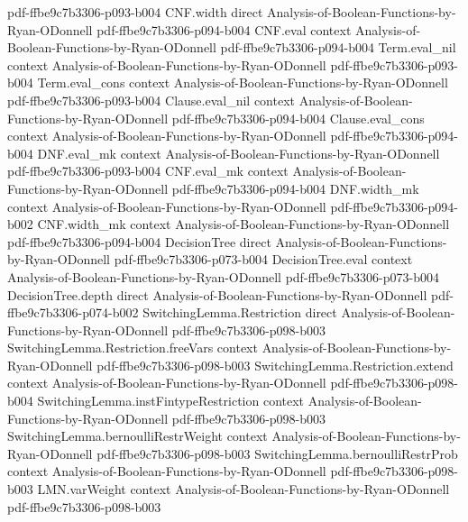 \begin{lemma}
  {pdf-ffbe9c7b3306-p093-b004}
\proofstep
  {CNF.width}
  {direct}
  {Analysis-of-Boolean-Functions-by-Ryan-ODonnell}
  {pdf-ffbe9c7b3306-p094-b004}
\proofstep
  {CNF.eval}
  {context}
  {Analysis-of-Boolean-Functions-by-Ryan-ODonnell}
  {pdf-ffbe9c7b3306-p094-b004}
\proofstep
  {Term.eval_nil}
  {context}
  {Analysis-of-Boolean-Functions-by-Ryan-ODonnell}
  {pdf-ffbe9c7b3306-p093-b004}
\proofstep
  {Term.eval_cons}
  {context}
  {Analysis-of-Boolean-Functions-by-Ryan-ODonnell}
  {pdf-ffbe9c7b3306-p093-b004}
\proofstep
  {Clause.eval_nil}
  {context}
  {Analysis-of-Boolean-Functions-by-Ryan-ODonnell}
  {pdf-ffbe9c7b3306-p094-b004}
\proofstep
  {Clause.eval_cons}
  {context}
  {Analysis-of-Boolean-Functions-by-Ryan-ODonnell}
  {pdf-ffbe9c7b3306-p094-b004}
\proofstep
  {DNF.eval_mk}
  {context}
  {Analysis-of-Boolean-Functions-by-Ryan-ODonnell}
  {pdf-ffbe9c7b3306-p093-b004}
\proofstep
  {CNF.eval_mk}
  {context}
  {Analysis-of-Boolean-Functions-by-Ryan-ODonnell}
  {pdf-ffbe9c7b3306-p094-b004}
\proofstep
  {DNF.width_mk}
  {context}
  {Analysis-of-Boolean-Functions-by-Ryan-ODonnell}
  {pdf-ffbe9c7b3306-p094-b002}
\proofstep
  {CNF.width_mk}
  {context}
  {Analysis-of-Boolean-Functions-by-Ryan-ODonnell}
  {pdf-ffbe9c7b3306-p094-b004}
\proofstep
  {DecisionTree}
  {direct}
  {Analysis-of-Boolean-Functions-by-Ryan-ODonnell}
  {pdf-ffbe9c7b3306-p073-b004}
\proofstep
  {DecisionTree.eval}
  {context}
  {Analysis-of-Boolean-Functions-by-Ryan-ODonnell}
  {pdf-ffbe9c7b3306-p073-b004}
\proofstep
  {DecisionTree.depth}
  {direct}
  {Analysis-of-Boolean-Functions-by-Ryan-ODonnell}
  {pdf-ffbe9c7b3306-p074-b002}
\proofstep
  {SwitchingLemma.Restriction}
  {direct}
  {Analysis-of-Boolean-Functions-by-Ryan-ODonnell}
  {pdf-ffbe9c7b3306-p098-b003}
\proofstep
  {SwitchingLemma.Restriction.freeVars}
  {context}
  {Analysis-of-Boolean-Functions-by-Ryan-ODonnell}
  {pdf-ffbe9c7b3306-p098-b003}
\proofstep
  {SwitchingLemma.Restriction.extend}
  {context}
  {Analysis-of-Boolean-Functions-by-Ryan-ODonnell}
  {pdf-ffbe9c7b3306-p098-b004}
\proofstep
  {SwitchingLemma.instFintypeRestriction}
  {context}
  {Analysis-of-Boolean-Functions-by-Ryan-ODonnell}
  {pdf-ffbe9c7b3306-p098-b003}
\proofstep
  {SwitchingLemma.bernoulliRestrWeight}
  {context}
  {Analysis-of-Boolean-Functions-by-Ryan-ODonnell}
  {pdf-ffbe9c7b3306-p098-b003}
\proofstep
  {SwitchingLemma.bernoulliRestrProb}
  {context}
  {Analysis-of-Boolean-Functions-by-Ryan-ODonnell}
  {pdf-ffbe9c7b3306-p098-b003}
\proofstep
  {LMN.varWeight}
  {context}
  {Analysis-of-Boolean-Functions-by-Ryan-ODonnell}
  {pdf-ffbe9c7b3306-p098-b003}

\end{lemma}
